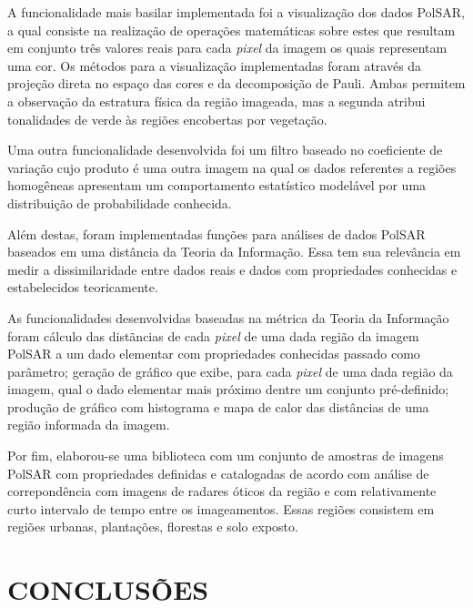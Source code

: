 \documentclass[12pt,letterpaper]{article}
\begin{document}
A funcionalidade mais basilar implementada foi a visualização dos dados PolSAR, a qual consiste na realização de operações matemáticas sobre estes que resultam em conjunto três valores reais para cada \textit{pixel} da imagem os quais representam uma cor. Os métodos para a visualização implementadas foram através da projeção direta no espaço das cores e da decomposição de Pauli. Ambas permitem a observação da estratura física da região imageada, mas a segunda atribui tonalidades de verde às regiões encobertas por vegetação. 

Uma outra funcionalidade desenvolvida foi um filtro baseado no coeficiente de variação cujo produto é uma outra imagem na qual os dados referentes a regiões homogêneas apresentam um comportamento estatístico modelável por uma distribuição de probabilidade conhecida.

Além destas, foram implementadas funções para análises de dados PolSAR baseados em uma distância da Teoria da Informação. Essa tem sua relevância em medir a dissimilaridade entre dados reais e dados com propriedades conhecidas e estabelecidos teoricamente. 

As funcionalidades desenvolvidas baseadas na métrica da Teoria da Informação foram cálculo das distãncias de cada \textit{pixel} de uma dada região da imagem PolSAR a um dado elementar com propriedades conhecidas passado como parâmetro; geração de gráfico que exibe, para cada \textit{pixel} de uma dada região da imagem, qual o dado elementar mais próximo dentre um conjunto pré-definido; produção de gráfico com histograma e mapa de calor das distâncias de uma região informada da imagem. 

Por fim, elaborou-se uma biblioteca com um conjunto de amostras de imagens PolSAR com propriedades definidas e catalogadas de acordo com análise de correpondência com imagens de radares óticos da região e com relativamente curto intervalo de tempo entre os imageamentos. Essas regiões consistem em regiões urbanas, plantações, florestas e solo exposto.

  
  \newpage
\section*{\centering \textbf{CONCLUSÕES}} %



  
\end{document}
